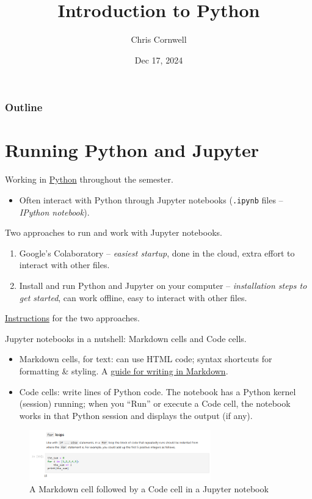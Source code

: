 \documentclass{beamer}
\author{Chris Cornwell}
\date{Dec 17, 2024}
\title{Introduction to Python}
\theoremstyle{example}
\begin{document}
\begin{frame}
\titlepage
\end{frame}

\begin{frame}
\frametitle{Outline}
\tableofcontents
\end{frame}

\section{Running Python and Jupyter}

\begin{frame}
Working in \href{https://www.python.org/}{Python} throughout the semester. 
\begin{itemize}
	\item[] Often interact with Python through Jupyter notebooks (\texttt{.ipynb} files {--} \emph{IPython notebook}).
\end{itemize}

\pause
Two approaches to run and work with Jupyter notebooks.
\begin{enumerate}
	\item Google's Colaboratory {--} \emph{easiest startup}, done in the cloud, extra effort to interact with other files.
	\item Install and run Python and Jupyter on your computer {--} \emph{installation steps to get started}, can work offline, easy to interact with other files.
\end{enumerate}

\href{https://github.com/cornwell/math371-S25/blob/main/Lectures/README.md}{Instructions} for the two approaches.
\end{frame}

\begin{frame}
Jupyter notebooks in a nutshell: Markdown cells and Code cells.
	\begin{itemize}
	 	\item Markdown cells, for text: can use HTML code; syntax shortcuts for formatting \& styling. A \href{https://docs.github.com/en/get-started/writing-on-github/getting-started-with-writing-and-formatting-on-github/basic-writing-and-formatting-syntax}{guide for writing in Markdown}.
	 	\pause
	 	\item Code cells: write lines of Python code. The notebook has a Python kernel (session) running; when you ``Run'' or execute a Code cell, the notebook works in that Python session and displays the output (if any).
	\end{itemize}
	\pause
	\begin{figure}
		\includegraphics[width=0.7\textwidth]{markdown-code-together.png}
	\caption{{\tiny A Markdown cell followed by a Code cell in a Jupyter notebook}}
	\end{figure}
\end{frame}
\end{document}

